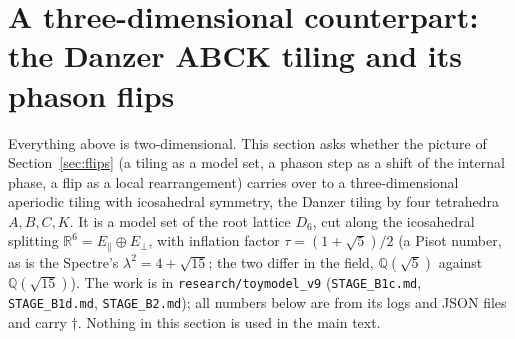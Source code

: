 \documentclass[11pt]{article}
\theoremstyle{definition}
\begin{document}
\section{A three-dimensional counterpart: the Danzer ABCK tiling and its phason flips}\label{app:danzer}
Everything above is two-dimensional. This section asks whether the picture of Section~\ref{sec:flips} (a tiling as a model set, a phason step as a shift of the internal phase, a flip as a local rearrangement) carries over to a three-dimensional aperiodic tiling with icosahedral symmetry, the Danzer tiling by four tetrahedra $A,B,C,K$. It is a model set of the root lattice $D_6$, cut along the icosahedral splitting $\mathbb{R}^6=E_\parallel\oplus E_\perp$, with inflation factor $\tau=(1+\sqrt5)/2$ (a Pisot number, as is the Spectre's $\lambda^2=4+\sqrt{15}$; the two differ in the field, $\mathbb{Q}(\sqrt5)$ against $\mathbb{Q}(\sqrt{15})$). The work is in \texttt{research/toymodel\_v9} (\texttt{STAGE\_B1c.md}, \texttt{STAGE\_B1d.md}, \texttt{STAGE\_B2.md}); all numbers below are from its logs and JSON files and carry $\dagger$. Nothing in this section is used in the main text.
\end{document}
